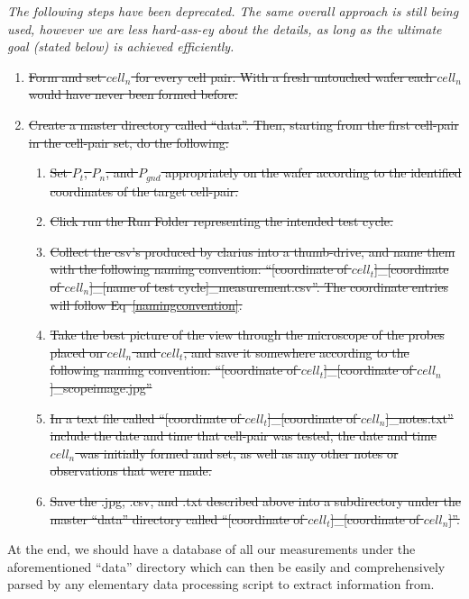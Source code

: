 \documentclass{article}
\begin{document}
        \textit{The following steps have been deprecated. The same overall approach is still being used, however we are
        less hard-ass-ey about the details, as long as the ultimate goal (stated below) is achieved efficiently.}
        \begin{enumerate}
          \item \sout{Form and set $cell_n$ for every cell pair. With a fresh untouched wafer each $cell_n$ would have
            never been formed before.}
          \item \sout{Create a master directory called ``data''. Then, starting from the first cell-pair in the
            cell-pair set, do the following:}
          \begin{enumerate}
            \item \sout{Set $P_t$, $P_n$, and $P_{gnd}$ appropriately on the wafer according to the identified
              coordinates of the target cell-pair.}
            \item \sout{Click run the Run Folder representing the intended test cycle.}
            \item \sout{Collect the csv's produced by clarius into a thumb-drive, and name them with the following
              naming convention: ``[coordinate of $cell_t$]\_[coordinate of $cell_n$]\_[name of test
              cycle]\_measurement.csv''. The coordinate entries will follow Eq~\ref{namingconvention}.}
            \item \sout{Take the best picture of the view through the microscope of the probes placed on $cell_n$ and
              $cell_t$, and save it somewhere according to the following naming convention: ``[coordinate of
              $cell_t$]\_[coordinate of $cell_n$]\_scopeimage.jpg''}
            \item \sout{In a text file called ``[coordinate of $cell_t$]\_[coordinate of $cell_n$]\_notes.txt'' include
              the date and time that cell-pair was tested, the date and time $cell_n$ was initially formed and set, as
              well as any other notes or observations that were made.}
            \item \sout{Save the .jpg, .csv, and .txt described above into a subdirectory under the master ``data''
              directory called ``[coordinate of $cell_t$]\_[coordinate of $cell_n$]''.}
          \end{enumerate}
        \end{enumerate}

        At the end, we should have a database of all our measurements under the aforementioned ``data'' directory which
        can then be easily and comprehensively parsed by any elementary data processing script to extract information
        from.
\end{document}
